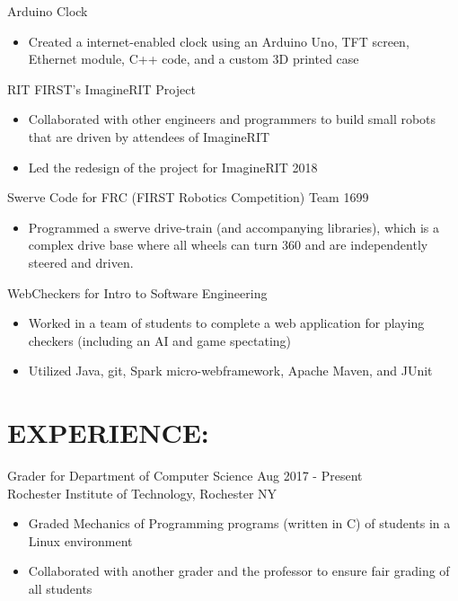 \documentclass[line,margin]{res}
\begin{document}
\begin{resume}
	Arduino Clock
	\begin{itemize}
		\item Created a internet-enabled clock using an Arduino Uno, TFT screen, Ethernet module, C++ code, and a custom 3D printed case
	\end{itemize}
	\vspace{-10pt}

	RIT FIRST's ImagineRIT Project
	\begin{itemize}
		\item Collaborated with other engineers and programmers to build small robots that are driven by attendees of ImagineRIT 
		\item Led the redesign of the project for ImagineRIT 2018
	\end{itemize}
	\vspace{-10pt}

	Swerve Code for FRC (FIRST Robotics Competition) Team 1699
	\begin{itemize} 
		\item Programmed a swerve drive-train (and accompanying libraries), which is a complex drive base where all wheels can turn 360\textdegree \hspace{.5pt} and are independently steered and driven.
	\end{itemize}
	\vspace{-10pt}

	WebCheckers for Intro to Software Engineering
	\begin{itemize}
		\item Worked in a team of students to complete a web application for playing checkers (including an AI and game spectating)
		\item Utilized Java, git, Spark micro-webframework, Apache Maven, and JUnit
	\end{itemize}

\section{EXPERIENCE:}

	Grader for Department of Computer Science \hfill Aug 2017 - Present\\
	Rochester Institute of Technology, Rochester NY
	\begin{itemize}
		\item Graded Mechanics of Programming programs (written in C) of students in a Linux environment
		\item Collaborated with another grader and the professor to ensure fair grading of all students
	\end{itemize}


\end{resume}
\end{document}
